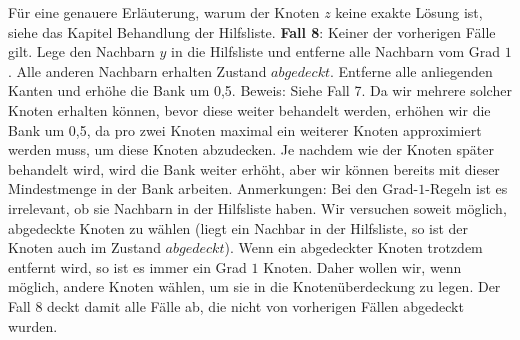 \documentclass[12pt,onecolumn, notitlepage]{scrartcl}
\begin{document}
Für eine genauere Erläuterung, warum der Knoten $z$ keine exakte Lösung ist, siehe das Kapitel Behandlung der Hilfsliste. \newline \newline
\textbf{Fall 8}:\newline
Keiner der vorherigen Fälle gilt. Lege den Nachbarn $y$ in die Hilfsliste und entferne alle Nachbarn vom Grad $1$. Alle anderen Nachbarn erhalten Zustand $abgedeckt$.  Entferne alle anliegenden Kanten und erhöhe die Bank um 0,5.\newline
Beweis: Siehe Fall 7. Da wir mehrere solcher Knoten erhalten können, bevor diese weiter behandelt werden, erhöhen wir die Bank um 0,5, da pro zwei Knoten maximal ein weiterer Knoten approximiert werden muss, um diese Knoten abzudecken. Je nachdem wie der Knoten später behandelt wird, wird die Bank weiter erhöht, aber wir können bereits mit dieser Mindestmenge in der Bank arbeiten.
\newline
Anmerkungen:\newline
Bei den Grad-$1$-Regeln ist es irrelevant, ob sie Nachbarn in der Hilfsliste haben. Wir versuchen soweit möglich, abgedeckte Knoten zu wählen (liegt ein Nachbar in der Hilfsliste, so ist der Knoten auch im Zustand $abgedeckt$). Wenn ein abgedeckter Knoten trotzdem entfernt wird, so ist es immer ein Grad $1$ Knoten. Daher wollen wir, wenn möglich, andere Knoten wählen, um sie in die Knotenüberdeckung zu legen.
Der Fall 8 deckt damit alle Fälle ab, die nicht von vorherigen Fällen abgedeckt wurden.
\end{document}
